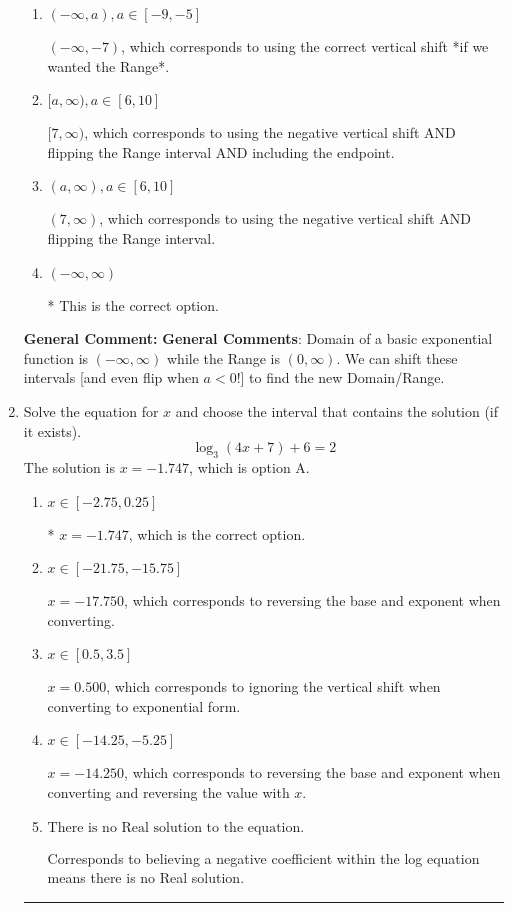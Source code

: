 \documentclass{extbook}[14pt]
\newcommand{\litem}[1]{\item #1

\rule{\textwidth}{0.4pt}}
\begin{document}
\begin{enumerate}
{\begin{enumerate}[label=\Alph*.]
$(-\infty, -7]$, which corresponds to using the correct vertical shift *if we wanted the Range* AND including the endpoint.
\item \( (-\infty, a), a \in [-9, -5] \)

$(-\infty, -7)$, which corresponds to using the correct vertical shift *if we wanted the Range*.
\item \( [a, \infty), a \in [6, 10] \)

$[7, \infty)$, which corresponds to using the negative vertical shift AND flipping the Range interval AND including the endpoint.
\item \( (a, \infty), a \in [6, 10] \)

$(7, \infty)$, which corresponds to using the negative vertical shift AND flipping the Range interval.
\item \( (-\infty, \infty) \)

* This is the correct option.
\end{enumerate}

\textbf{General Comment:} \textbf{General Comments}: Domain of a basic exponential function is $(-\infty, \infty)$ while the Range is $(0, \infty)$. We can shift these intervals [and even flip when $a<0$!] to find the new Domain/Range.
}
\litem{
Solve the equation for $x$ and choose the interval that contains the solution (if it exists).
\[ \log_{3}{(4x+7)}+6 = 2 \]The solution is \( x = -1.747 \), which is option A.\begin{enumerate}[label=\Alph*.]
\item \( x \in [-2.75, 0.25] \)

* $x = -1.747$, which is the correct option.
\item \( x \in [-21.75, -15.75] \)

$x = -17.750$, which corresponds to reversing the base and exponent when converting.
\item \( x \in [0.5, 3.5] \)

$x = 0.500$, which corresponds to ignoring the vertical shift when converting to exponential form.
\item \( x \in [-14.25, -5.25] \)

$x = -14.250$, which corresponds to reversing the base and exponent when converting and reversing the value with $x$.
\item \( \text{There is no Real solution to the equation.} \)

Corresponds to believing a negative coefficient within the log equation means there is no Real solution.
\end{enumerate}

}
\end{enumerate}
\end{document}
